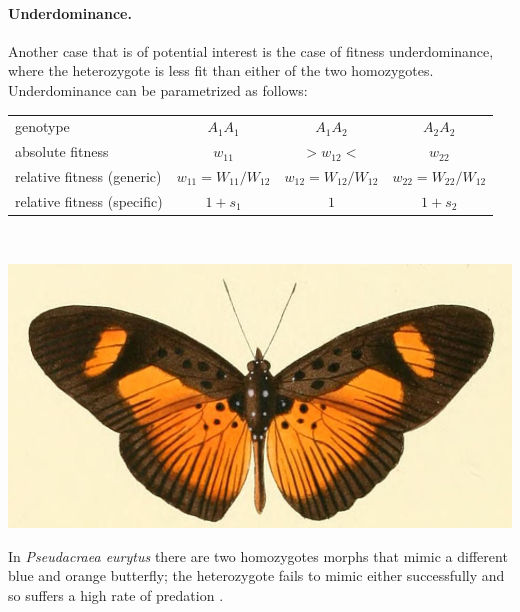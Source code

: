 \paragraph{Underdominance.} Another case that is of potential interest is the case of fitness
underdominance, where the heterozygote is less fit than either of the two
homozygotes. Underdominance can be parametrized as follows: \\
\begin{center}
\begin{tabular}{lccc}
	genotype & $A_1A_1$ & $A_1A_2$ & $A_2A_2$ \\
	absolute fitness & $w_{11}$ & $>w_{12}<$ & $w_{22}$ \\
	relative fitness (generic) & $w_{11}=W_{11}/W_{12}$ & $w_{12} = W_{12}/W_{12}$ & $w_{22} = W_{22}/W_{12}$ \\
	relative fitness (specific)  & $1+s_1$ & $1$ & $1+s_2$ \\
\end{tabular}\\
\end{center}
\begin{marginfigure}[5cm]
\begin{center}
  \includegraphics[width = \textwidth]{illustration_images/single_locus_selection/Pseudacraea_eurytus/Pseudacraea_eurytus.JPG}
\end{center}
\caption{In {\it Pseudacraea eurytus} there are two homozygotes morphs that mimic
 a different blue and orange butterfly; the heterozygote fails to mimic
either successfully and so suffers a high rate of predation
\citep{owen1972polymorphic}. } \label{fig:underdom_buttfly}  %
\end{marginfigure}


